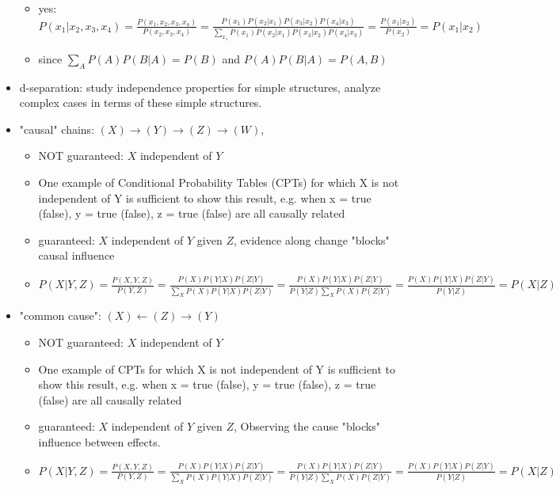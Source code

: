 \documentclass[10pt]{article}
\begin{document}
\begin{itemize}[label=\(\star\), leftmargin=1em, itemsep=-0.3em]
          \begin{itemize}[label=\(\star\), leftmargin=1em, itemsep=-0.2em]
              \item[] yes:  $P(x_1| x_2, x_3, x_4) = \frac{P(x_1, x_2, x_3, x_4 )}{P(x_2, x_3, x_4)} = \frac{P(x_1)P(x_2|x_1)P(x_3|x_2)P(x_4|x_3)}{\sum_{x_1} P(x_1)P(x_2|x_1)P(x_3|x_2)P(x_4|x_3)} = \frac{P(x_1|x_2)}{P(x_2)} = P(x_1|x_2)$
              \item[] since $\sum_{A} P(A)P(B|A) = P(B)$ and $P(A)P(B|A) = P(A,B)$
          \end{itemize}
    \item d-separation: study independence properties for simple structures, analyze complex cases in terms of these simple structures.
    \item "causal" chains: $(X) \rightarrow (Y) \rightarrow (Z) \rightarrow (W)$,
          \begin{itemize}[label=\(\star\), leftmargin=1em, itemsep=-0.2em]
              \item NOT guaranteed: $X$ independent of $Y$
              \item[] One example of Conditional Probability Tables (CPTs) for which X is not independent of Y is sufficient to show this result, e.g. when x = true (false), y = true (false), z = true (false) are all causally related
              \item guaranteed:  $X$  independent of $Y$ given $Z$, evidence along change "blocks" causal influence
              \item[] $P(X|Y,Z) = \frac{P(X,Y,Z)}{P(Y,Z)} = \frac{P(X)P(Y|X)P(Z|Y)}{\sum_{X} P(X)P(Y|X)P(Z|Y)} = \frac{P(X)P(Y|X)P(Z|Y)}{P(Y|Z)\sum_{X} P(X)P(Z|Y)} = \frac{P(X)P(Y|X)P(Z|Y)}{P(Y|Z)} = P(X|Z)$


          \end{itemize}
    \item "common cause": $(X) \leftarrow (Z) \rightarrow (Y)$
          \begin{itemize}[label=\(\star\), leftmargin=1em, itemsep=-0.2em]
              \item NOT guaranteed: $X$ independent of $Y$
              \item[] One example of CPTs for which X is not independent of Y is sufficient to show this result, e.g. when x = true (false), y = true (false), z = true (false) are all causally related
              \item guaranteed:  $X$  independent of $Y$ given $Z$, Observing the cause "blocks" influence between effects.
              \item[] $P(X|Y,Z) = \frac{P(X,Y,Z)}{P(Y,Z)} = \frac{P(X)P(Y|X)P(Z|Y)}{\sum_{X} P(X)P(Y|X)P(Z|Y)} = \frac{P(X)P(Y|X)P(Z|Y)}{P(Y|Z)\sum_{X} P(X)P(Z|Y)} = \frac{P(X)P(Y|X)P(Z|Y)}{P(Y|Z)} = P(X|Z)$



\end{itemize}
\end{itemize}
\end{document}
